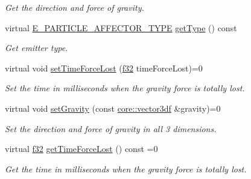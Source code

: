 \begin{DoxyCompactItemize}
\begin{DoxyCompactList}\small\item\em Get the direction and force of gravity. \end{DoxyCompactList}\item 
\mbox{\label{classirr_1_1scene_1_1IParticleGravityAffector_a60a002206e1fa758137f92b8dc390b7c}} 
virtual \hyperlink{namespaceirr_1_1scene_a34c0f9475cfcbda8b50ad816a046010b}{E\+\_\+\+P\+A\+R\+T\+I\+C\+L\+E\+\_\+\+A\+F\+F\+E\+C\+T\+O\+R\+\_\+\+T\+Y\+PE} \hyperlink{classirr_1_1scene_1_1IParticleGravityAffector_a60a002206e1fa758137f92b8dc390b7c}{get\+Type} () const
\begin{DoxyCompactList}\small\item\em Get emitter type. \end{DoxyCompactList}\item 
virtual void \hyperlink{classirr_1_1scene_1_1IParticleGravityAffector_a3910d872c740e678373cecbd5523ad38}{set\+Time\+Force\+Lost} (\hyperlink{namespaceirr_a0277be98d67dc26ff93b1a6a1d086b07}{f32} time\+Force\+Lost)=0
\begin{DoxyCompactList}\small\item\em Set the time in milliseconds when the gravity force is totally lost. \end{DoxyCompactList}\item 
\mbox{\label{classirr_1_1scene_1_1IParticleGravityAffector_ad5c31751978d5b0415a36353e4279e77}} 
virtual void \hyperlink{classirr_1_1scene_1_1IParticleGravityAffector_ad5c31751978d5b0415a36353e4279e77}{set\+Gravity} (const \hyperlink{namespaceirr_1_1core_ae6e2b2a6c552833ebbd5b7463d03586b}{core\+::vector3df} \&gravity)=0
\begin{DoxyCompactList}\small\item\em Set the direction and force of gravity in all 3 dimensions. \end{DoxyCompactList}\item 
\mbox{\label{classirr_1_1scene_1_1IParticleGravityAffector_a957d0e0d273e4c2fb4b2cc6017a67038}} 
virtual \hyperlink{namespaceirr_a0277be98d67dc26ff93b1a6a1d086b07}{f32} \hyperlink{classirr_1_1scene_1_1IParticleGravityAffector_a957d0e0d273e4c2fb4b2cc6017a67038}{get\+Time\+Force\+Lost} () const =0
\begin{DoxyCompactList}\small\item\em Get the time in milliseconds when the gravity force is totally lost. \end{DoxyCompactList}\item 

\end{DoxyCompactItemize}
